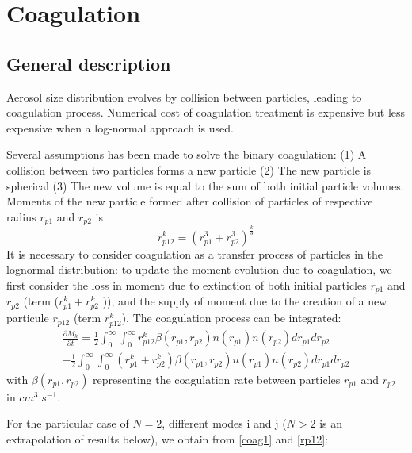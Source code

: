 \section{Coagulation}
\subsection{General description}
Aerosol size distribution evolves by collision between particles, leading to 
coagulation process. Numerical cost of coagulation treatment is expensive but less expensive when
a log-normal approach is used. 

Several assumptions has been made to solve the binary coagulation:
(1) A collision between two particles forms a new particle
(2) The new particle is spherical
(3) The new volume is equal to the sum of both initial particle volumes.
Moments of the new particle formed after collision of particles of respective radius 
$r_{p1}$ and $r_{p2}$ is 
\begin{equation}
r_{p12}^k = (r_{p1}^3 + r_{p2}^3)^{\frac{k}{3}}
\label{rp12}
\end{equation}
It is necessary to consider coagulation as a transfer process  of particles in 
the lognormal distribution: to update the moment evolution due to coagulation, 
 we first consider the loss in moment due to extinction of 
both initial particles 
 $r_{p1}$ and $r_{p2}$ (term ($r_{p1}^k + r_{p2}^k$ )), and the supply of moment 
due to the
 creation of a new particule  $r_{p12}$ (term  $r_{p12}^k$). 
 The coagulation process can be integrated:
 \begin{eqnarray}
\frac{\partial M_k}{\partial t} = \frac{1}{2} \int_{0}^{\infty} 
\int_{0}^{\infty} r_{p12}^k
\beta(r_{p1},r_{p2}) n(r_{p1}) n(r_{p2}) dr_{p1} dr_{p2} \nonumber \\
- \frac{1}{2} \int_{0}^{\infty} \int_{0}^{\infty} (r_{p1}^k + r_{p2}^k)
\beta(r_{p1},r_{p2}) n(r_{p1}) n(r_{p2})  dr_{p1} dr_{p2}
\label{coag1}
\end{eqnarray}
with $\beta(r_{p1},r_{p2})$ representing the coagulation rate between particles 
$r_{p1}$ and 
$ r_{p2}$ in $cm^3.s^{-1}$.

For the particular case of $N=2$, different modes i and j  ($N > 2$ is an 
extrapolation of results below),  we 
obtain from \ref{coag1} and \ref{rp12}:

